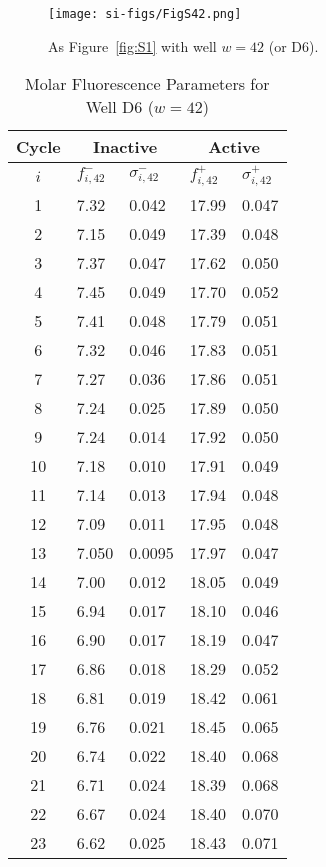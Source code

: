                \begin{figure}
                    \centering
                    \texttt{[image: si-figs/FigS42.png]}
                    \caption{
                        As Figure~\ref{fig:S1} with well $w=42$ (or D6).
                    }
                \end{figure}
                \clearpage
    \begin{table}
        \caption{Molar Fluorescence Parameters for Well D6 ($w=42$)}
        \centering
        \begin{tabular}{c|ll|ll}
            Cycle & \multicolumn{2}{c|}{Inactive} & \multicolumn{2}{c}{Active} \\
            \hline
            $i$ & $f_{i,42}^{-}$ & $\sigma_{i,42}^{-}$ &  $f_{i,42}^{+}$ & $\sigma_{i,42}^{+}$ \\
            \hline
    1 & 7.32 & 0.042 & 17.99 & 0.047 \\
2 & 7.15 & 0.049 & 17.39 & 0.048 \\
3 & 7.37 & 0.047 & 17.62 & 0.050 \\
4 & 7.45 & 0.049 & 17.70 & 0.052 \\
5 & 7.41 & 0.048 & 17.79 & 0.051 \\
6 & 7.32 & 0.046 & 17.83 & 0.051 \\
7 & 7.27 & 0.036 & 17.86 & 0.051 \\
8 & 7.24 & 0.025 & 17.89 & 0.050 \\
9 & 7.24 & 0.014 & 17.92 & 0.050 \\
10 & 7.18 & 0.010 & 17.91 & 0.049 \\
11 & 7.14 & 0.013 & 17.94 & 0.048 \\
12 & 7.09 & 0.011 & 17.95 & 0.048 \\
13 & 7.050 & 0.0095 & 17.97 & 0.047 \\
14 & 7.00 & 0.012 & 18.05 & 0.049 \\
15 & 6.94 & 0.017 & 18.10 & 0.046 \\
16 & 6.90 & 0.017 & 18.19 & 0.047 \\
17 & 6.86 & 0.018 & 18.29 & 0.052 \\
18 & 6.81 & 0.019 & 18.42 & 0.061 \\
19 & 6.76 & 0.021 & 18.45 & 0.065 \\
20 & 6.74 & 0.022 & 18.40 & 0.068 \\
21 & 6.71 & 0.024 & 18.39 & 0.068 \\
22 & 6.67 & 0.024 & 18.40 & 0.070 \\
23 & 6.62 & 0.025 & 18.43 & 0.071 \\

\end{tabular}
\end{table}
